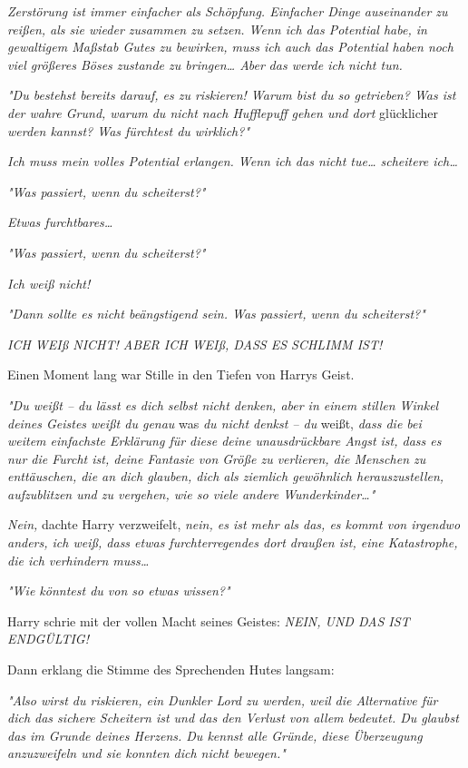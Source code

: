 {\emph{Zerstörung ist immer einfacher als Schöpfung. Einfacher Dinge auseinander zu reißen, als sie wieder zusammen zu setzen. Wenn ich das Potential habe, in gewaltigem Maßstab Gutes zu bewirken, muss ich auch das Potential haben noch viel größeres Böses zustande zu bringen… Aber} \emph{das werde ich nicht tun.}

\emph{"Du bestehst bereits darauf, es zu riskieren! Warum bist du so getrieben? Was ist der wahre Grund, warum du nicht nach Hufflepuff gehen und dort} glücklicher \emph{werden kannst? Was fürchtest du wirklich?"}

\emph{Ich muss mein volles Potential erlangen. Wenn ich das nicht tue… scheitere ich…}

\emph{"Was passiert, wenn du scheiterst?"}

\emph{Etwas furchtbares…}

\emph{"Was passiert, wenn du scheiterst?"}

\emph{Ich weiß nicht!}

\emph{"Dann sollte es nicht beängstigend sein. Was passiert, wenn du scheiterst?"}

\emph{ICH WEIß NICHT! ABER ICH WEIß, DASS ES SCHLIMM IST!}

Einen Moment lang war Stille in den Tiefen von Harrys Geist.

\emph{"Du weißt -- du lässt es dich selbst nicht denken, aber in einem stillen Winkel deines Geistes weißt du genau} was \emph{du nicht denkst -- du} weißt, \emph{dass die bei weitem einfachste Erklärung für diese deine unausdrückbare Angst ist, dass es nur die Furcht ist, deine Fantasie von Größe zu verlieren, die Menschen zu enttäuschen, die an dich glauben, dich als ziemlich gewöhnlich herauszustellen, aufzublitzen und zu vergehen, wie so viele andere Wunderkinder…"}

\emph{Nein,} dachte Harry verzweifelt, \emph{nein, es ist mehr als das, es kommt von irgendwo anders, ich weiß, dass etwas furchterregendes dort draußen ist, eine Katastrophe, die ich verhindern muss…}

\emph{"Wie könntest du von so etwas wissen?"}

Harry schrie mit der vollen Macht seines Geistes: \emph{NEIN, UND DAS IST ENDGÜLTIG!}

Dann erklang die Stimme des Sprechenden Hutes langsam:

\emph{"Also wirst du riskieren, ein Dunkler Lord zu werden, weil die Alternative für dich das sichere Scheitern ist und das den Verlust von allem bedeutet. Du glaubst das im Grunde deines Herzens. Du kennst alle Gründe, diese Überzeugung anzuzweifeln und sie konnten dich nicht bewegen."}

}
